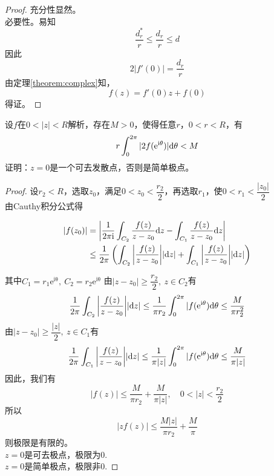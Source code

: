\begin{proof}

    充分性显然。\\
    必要性。易知
    $$\dfrac{d_r^{*}}{r} \leq \dfrac{d_r}{r} \leq d$$
    因此
    $$2|f'(0)| = \dfrac{d_r}{r}$$
    由定理\ref{theorem:complex}知，
    $$f(z) = f'(0)z + f(0)$$
    得证。

\end{proof}

\begin{proposition}
    
    设$f$在$0 < |z| < R$解析，存在$M >0$，使得任意$r$，$0 < r < R$，有
    $$r \int_{0}^{2 \pi}{|2f(\mathrm{e^{i\theta}})|}\mathrm{d} \theta < M$$
    证明：$z = 0$是一个可去发散点，否则是简单极点。

\end{proposition}

\begin{proof}
    
    设$r_2 < R$，选取$z_0$，满足$0 < z_0 < \dfrac{r_2}{2}$，再选取$r_1$，使$0 < r_1 < \dfrac{|z_0|}{2}$\\
    由\textup{Cauthy}积分公式得

    \begin{align*}
        |f(z_0)| & = \left| \dfrac{1}{2\mathrm{\pi i}} \int_{C_2}{\dfrac{f(z)}{z-z_0}}\mathrm{d} z - \int_{C_1}{\dfrac{f(z)}{z-z_0}}\mathrm{d} z \right|\\
        & \leq \dfrac{1}{2 \pi} \left(\int_{C_2}{\left|\dfrac{f(z)}{z-z_0}\right|}|\mathrm{d} z| + \int_{C_1}{\left|\dfrac{f(z)}{z-z_0}\right|}|\mathrm{d} z|\right)
    \end{align*}

    其中$C_1 = r_1\mathrm{e^{i\theta}},\ C_2 = r_2\mathrm{e^{i\theta}}$
    由$|z-z_0| \geq \dfrac{r_2}{2},\ z \in C_2$有
    $$ \dfrac{1}{2 \pi} \int_{C_2}{\left| \dfrac{f(z)}{z-z_0}\right|}|\mathrm{d} z| \leq \dfrac{1}{ \pi r_2}\int_{0}^{2 \pi}{|f(\mathrm{e}^{\mathrm{i}\theta})}\mathrm{d} \theta \leq \dfrac{M}{ \pi r_2^2}$$
    由$|z-z_0| \geq \dfrac{|z|}{2},\ z \in C_1$有
    $$ \dfrac{1}{2 \pi} \int_{C_1}{\left| \dfrac{f(z)}{z-z_0}\right|}|\mathrm{d} z| \leq \dfrac{1}{ \pi|z|}\int_{0}^{2 \pi}{|f(\mathrm{e}^{\mathrm{i}\theta})}\mathrm{d} \theta \leq \dfrac{M}{ \pi|z|}$$
    因此，我们有
    $$|f(z)| \leq \dfrac{M}{ \pi r_2} + \dfrac{M}{ \pi|z|},\quad 0 < |z| < \dfrac{r_2}{2}$$
    所以$$|zf(z)| \leq \dfrac{M|z|}{ \pi r_2} + \dfrac{M}{\pi}$$
    则极限是有限的。\\
    $z = 0$是可去极点，极限为$0$.\\
    $z = 0$是简单极点，极限非$0$.

\end{proof}

